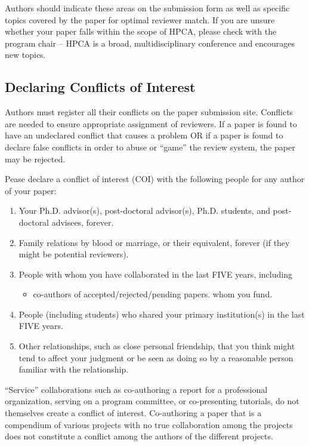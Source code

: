 \documentclass{sig-alternate}
\begin{document}
Authors should indicate these areas on the submission form as
well as specific topics covered by the paper for optimal reviewer match. If
you are unsure whether your paper falls within the scope of HPCA, please
check with the program chair -- HPCA is a broad, multidisciplinary
conference and encourages new topics.

\subsection{Declaring Conflicts of Interest}

Authors must register all their conflicts on the paper submission site.
Conflicts are needed to ensure appropriate assignment of reviewers.
If a paper is found to have an undeclared conflict that causes
a problem OR if a paper is found to declare false conflicts in order to
abuse or ``game'' the review system, the paper may be rejected.

Pease declare a conflict of interest (COI) with the following people for any author of your paper:

\begin{enumerate}
\item Your Ph.D. advisor(s), post-doctoral advisor(s), Ph.D. students,
      and post-doctoral advisees, forever.
\item Family relations by blood or marriage, or their equivalent,
      forever (if they might be potential reviewers).
\item People with whom you have collaborated in the last FIVE years, including
\begin{itemize}
\item co-authors of accepted/rejected/pending papers.
      whom you fund.
\end{itemize}
\item People (including students) who shared your primary institution(s) in the
last FIVE years.
\item Other relationships, such as close personal friendship, that you think might tend
to affect your judgment or be seen as doing so by a reasonable person familiar
with the relationship.
\end{enumerate}

``Service'' collaborations such as co-authoring a report for a professional
organization, serving on a program committee, or co-presenting
tutorials, do not themselves create a conflict of interest.
Co-authoring a paper that is a compendium of various projects with
no true collaboration among the projects does not constitute a
conflict among the authors of the different projects.
\end{document}
